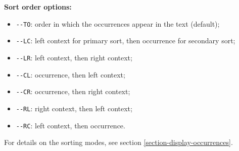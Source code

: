 \bigskip
\noindent \textbf{Sort order options:}
\begin{itemize}
  \item \verb+--TO+: order in which the occurrences appear in the text
  (default);
  \item \verb+--LC+: left context for primary sort, then occurrence for
    secondary sort;
  \item \verb+--LR+: left context, then right context;
  \item \verb+--CL+: occurrence, then left context;
  \item \verb+--CR+: occurrence, then right context;
  \item \verb+--RL+: right context, then left context;
  \item \verb+--RC+: left context, then occurrence.
\end{itemize}
\noindent For details on the sorting modes, see section
\ref{section-display-occurrences}.

